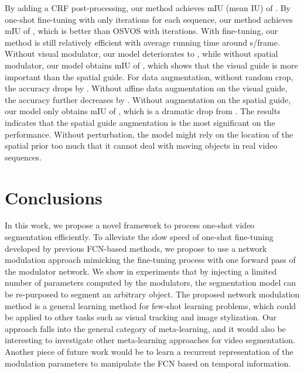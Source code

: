 \documentclass[10pt,twocolumn,letterpaper]{article}
\begin{document}
By adding a CRF post-processing, our method achieves mIU (mean IU) of . By one-shot fine-tuning with only  iterations for each sequence, our method achieves mIU of , which is  better than OSVOS with  iterations. With fine-tuning, our method is still relatively efficient with average running time around  s/frame. Without visual modulator, our model deteriorates to , while without spatial modulator, our model obtains mIU of , which shows that the visual guide is more important than the spatial guide. For data augmentation, without random crop, the accuracy drops by . Without affine data augmentation on the visual guide, the accuracy further decreases by . Without augmentation on the spatial guide, our model only obtains mIU of , which is a dramatic drop from . The results indicates that the spatial guide augmentation is the most significant on the performance. Without perturbation, the model might rely on the location of the spatial prior too much that it cannot deal with moving objects in real video sequences.

\section{Conclusions}
In this work, we propose a novel framework to process one-shot video segmentation efficiently. To alleviate the slow speed of one-shot fine-tuning developed by previous FCN-based methods, we propose to use a network modulation approach mimicking the fine-tuning process with one forward pass of the modulator network. We show in experiments that by injecting a limited number of parameters computed by the modulators, the segmentation model can be re-purposed to segment an arbitrary object. The proposed network modulation method is a general learning method for few-shot learning problems, which could be applied to other tasks such as visual tracking and image stylization. Our approach falls into the general category of meta-learning, and it would also be interesting to investigate other meta-learning approaches for video segmentation. Another piece of future work would be to learn a recurrent representation of the modulation parameters to manipulate the FCN based on temporal information. 

{\small


}
\end{document}
